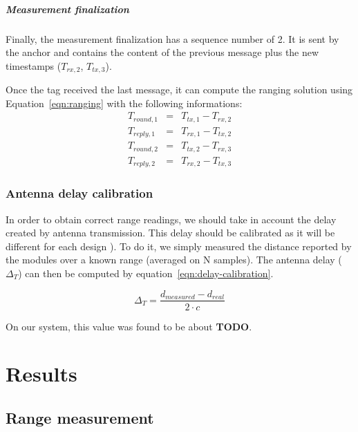 \documentclass[a4paper]{scrreprt}
\begin{document}
\paragraph{Measurement finalization}
Finally, the measurement finalization has a sequence number of 2.
It is sent by the anchor and contains the content of the previous message plus the new timestamps ($T_{rx,2}$, $T_{tx,3}$).

Once the tag received the last message, it can compute the ranging solution using Equation~\ref{eqn:ranging} with the following informations:
\begin{eqnarray*}
    T_{round,1} &=& T_{tx,1} - T_{rx,2} \\
    T_{reply,1} &=& T_{rx,1} - T_{tx,2} \\
    T_{round,2} &=& T_{tx,2} - T_{rx,3} \\
    T_{reply,2} &=& T_{rx,2} - T_{tx,3} 
\end{eqnarray*}



\subsection{Antenna delay calibration}
In order to obtain correct range readings, we should take in account the delay created by antenna transmission.
This delay should be calibrated as it will be different for each design \cite{dw1000manual}).
To do it, we simply measured the distance reported by the modules over a known range (averaged on N samples).
The antenna delay ($\Delta_T$) can then be computed by equation~\ref{eqn:delay-calibration}.

\begin{equation}
    \Delta_T = \frac{d_{measured} - d_{real}}{2\cdot c}
    \label{eqn:delay-calibration}
\end{equation}

On our system, this value was found to be about \textbf{TODO}.

\chapter{Results}

\section{Range measurement}

\end{document}
